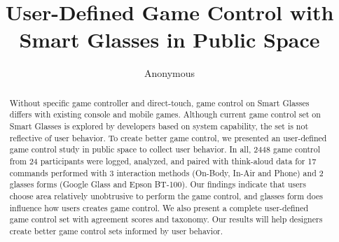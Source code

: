 \documentclass{sigchi}
\begin{document}
\title{User-Defined Game Control with \\Smart Glasses in Public Space}

\author{\alignauthor Anonymous
 \\ 
}


\maketitle




\begin{abstract}
Without specific game controller and direct-touch, game control on Smart Glasses differs with existing console and mobile games. Although current game control set on Smart Glasses is explored by developers based on system capability, the set is not reflective of user behavior.
To create better game control, we presented an user-defined game control study in public space to collect user behavior. In all, 2448 game control from 24 participants were logged, analyzed, and paired with think-aloud data for 17 commands performed with 3 interaction methods (On-Body, In-Air and Phone) and 2 glasses forms (Google Glass and Epson BT-100). 
Our findings indicate that users choose area relatively unobtrusive to perform the game control, and glasses form does influence how users creates game control. We also present a complete user-defined game control set with agreement scores and taxonomy. 
Our results will help designers create better game control sets informed by user behavior.
\end{abstract}


\end{document}
